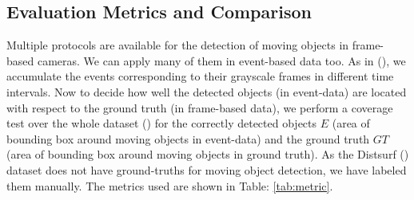 \documentclass{article}
\begin{document}
\begin{table*}[]
\centering
\caption{Comparison of GSCEventMOD with the state-of-the-art methods. Note that the precision and recall scores are in percentage. The best results are in bold.}
\label{tab:metric table}
\end{table*}






\subsection{Evaluation Metrics and Comparison}

Multiple protocols are available for the detection of moving objects in frame-based cameras. We can apply many of them in event-based data too. As in (\cite{chen2018neuromorphic}), we accumulate the events corresponding to their grayscale frames in different time intervals. Now to decide how well the detected objects (in event-data) are located with respect to the ground truth (in frame-based data), we perform a coverage test over the whole dataset (\cite{pikatkowska2012spatiotemporal}) for the correctly detected objects $E$ (area of bounding box around moving objects in event-data) and the ground truth $GT$ (area of bounding box around moving objects in ground truth). As the Distsurf (\cite{almatrafi2020distance}) dataset does not have ground-truths for moving object detection, we have labeled them manually. The metrics used are shown in Table: \ref{tab:metric}. 
\end{document}
